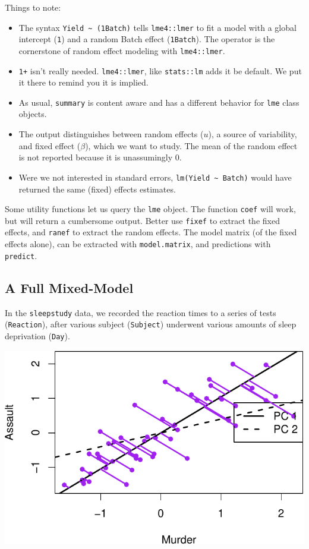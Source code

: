 \documentclass[]{book}
\providecommand{\tightlist}{%
  \setlength{\itemsep}{0pt}\setlength{\parskip}{0pt}}
\theoremstyle{definition}
\theoremstyle{definition}
\theoremstyle{definition}
\theoremstyle{remark}
\begin{document}
Things to note:

\begin{itemize}
\tightlist
\item
  The syntax \texttt{Yield\ \textasciitilde{}\ (1\textbar{}Batch)} tells \texttt{lme4::lmer} to fit a model with a global intercept (\texttt{1}) and a random Batch effect (\texttt{1\textbar{}Batch}). The \texttt{\textbar{}} operator is the cornerstone of random effect modeling with \texttt{lme4::lmer}.
\item
  \texttt{1+} isn't really needed. \texttt{lme4::lmer}, like \texttt{stats::lm} adds it be default. We put it there to remind you it is implied.
\item
  As usual, \texttt{summary} is content aware and has a different behavior for \texttt{lme} class objects.
\item
  The output distinguishes between random effects (\(u\)), a source of variability, and fixed effect (\(\beta\)), which we want to study. The mean of the random effect is not reported because it is unassumingly 0.
\item
  Were we not interested in standard errors, \texttt{lm(Yield\ \textasciitilde{}\ Batch)} would have returned the same (fixed) effects estimates.
\end{itemize}

Some utility functions let us query the \texttt{lme} object.
The function \texttt{coef} will work, but will return a cumbersome output. Better use \texttt{fixef} to extract the fixed effects, and \texttt{ranef} to extract the random effects.
The model matrix (of the fixed effects alone), can be extracted with \texttt{model.matrix}, and predictions with \texttt{predict}.

\hypertarget{a-full-mixed-model}{%
\subsection{A Full Mixed-Model}\label{a-full-mixed-model}}

In the \texttt{sleepstudy} data, we recorded the reaction times to a series of tests (\texttt{Reaction}), after various subject (\texttt{Subject}) underwent various amounts of sleep deprivation (\texttt{Day}).

\includegraphics[width=0.5\linewidth]{Rcourse_files/figure-latex/unnamed-chunk-200-1}
\end{document}
